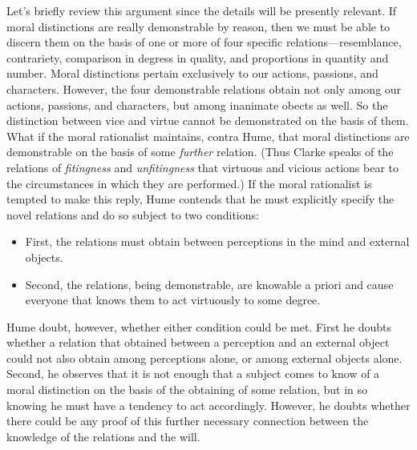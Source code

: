 Let's briefly review this argument since the details will be presently relevant. If moral distinctions are really demonstrable by reason, then we must be able to discern them on the basis of one or more of four specific relations---resemblance, contrariety, comparison in degress in quality, and proportions in quantity and number. Moral distinctions pertain exclusively to our actions, passions, and characters. However, the four demonstrable relations obtain not only among our actions, passions, and characters, but among inanimate obects as well. So the distinction between vice and virtue cannot be demonstrated on the basis of them. What if the moral rationalist maintains, contra Hume, that moral distinctions are demonstrable on the basis of some \emph{further} relation. (Thus Clarke speaks of the relations of \emph{fitingness} and \emph{unfitingness} that virtuous and vicious actions bear to the circumstances in which they are performed.) If the moral rationalist is tempted to make this reply, Hume contends that he must explicitly specify the novel relations and do so subject to two conditions:
\begin{itemize}
    \item First, the relations must obtain between perceptions in the mind and external objects.
    \item Second, the relations, being demonstrable, are knowable a priori and cause everyone that knows them to act virtuously to some degree.
\end{itemize}
Hume doubt, however, whether either condition could be met. First he doubts whether a relation that obtained between a perception and an external object could not also obtain among perceptions alone, or among external objects alone. Second, he observes that it is not enough that a subject comes to know of a moral distinction on the basis of the obtaining of some relation, but in so knowing he must have a tendency to act accordingly. However, he doubts whether there could be any proof of this further necessary connection between the knowledge of the relations and the will.

% 

